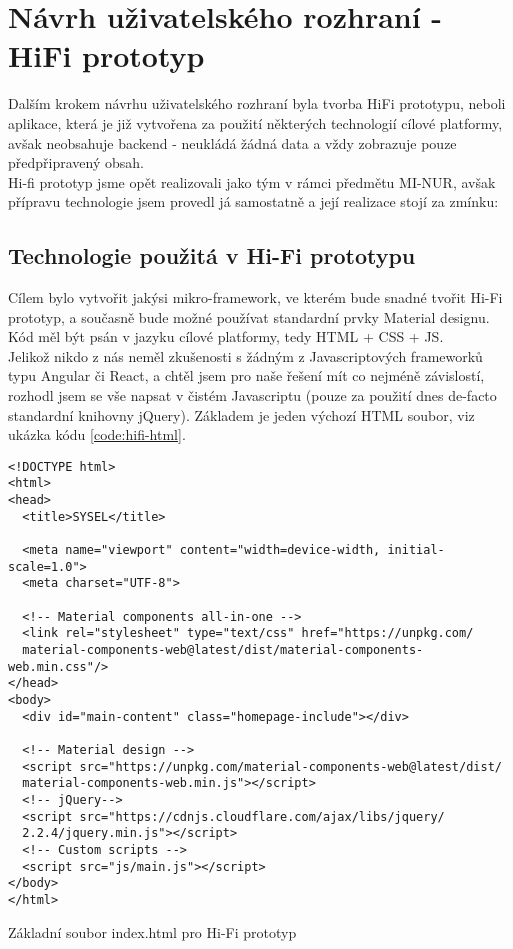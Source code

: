 \section{Návrh uživatelského rozhraní - HiFi prototyp}

Dalším krokem návrhu uživatelského rozhraní byla tvorba HiFi prototypu, neboli aplikace, která je již vytvořena za použití některých technologií cílové platformy, avšak neobsahuje backend - neukládá žádná data a vždy zobrazuje pouze předpřipravený obsah.\\
Hi-fi prototyp jsme opět realizovali jako tým v rámci předmětu MI-NUR, avšak přípravu technologie jsem provedl já samostatně a její realizace stojí za zmínku:

\subsection{Technologie použitá v Hi-Fi prototypu}

Cílem bylo vytvořit jakýsi mikro-framework, ve kterém bude snadné tvořit Hi-Fi prototyp, a současně bude možné používat standardní prvky Material designu. Kód měl být psán v jazyku cílové platformy, tedy HTML + CSS + JS.\\
Jelikož nikdo z nás neměl zkušenosti s žádným z Javascriptových frameworků typu Angular či React, a chtěl jsem pro naše řešení mít co nejméně závislostí, rozhodl jsem se vše napsat v čistém Javascriptu (pouze za použití dnes de-facto standardní knihovny jQuery). Základem je jeden výchozí HTML soubor, viz ukázka kódu \ref{code:hifi-html}.

\begin{listing}[H]
\begin{verbatim}
<!DOCTYPE html>
<html>
<head>
  <title>SYSEL</title>

  <meta name="viewport" content="width=device-width, initial-scale=1.0">
  <meta charset="UTF-8">

  <!-- Material components all-in-one -->
  <link rel="stylesheet" type="text/css" href="https://unpkg.com/
  material-components-web@latest/dist/material-components-web.min.css"/>
</head>
<body>
  <div id="main-content" class="homepage-include"></div>

  <!-- Material design -->
  <script src="https://unpkg.com/material-components-web@latest/dist/
  material-components-web.min.js"></script>
  <!-- jQuery-->
  <script src="https://cdnjs.cloudflare.com/ajax/libs/jquery/
  2.2.4/jquery.min.js"></script>
  <!-- Custom scripts -->
  <script src="js/main.js"></script>
</body>
</html>
\end{verbatim}
\caption{Základní soubor index.html pro Hi-Fi prototyp} \label{code:hifi-html}
\end{listing}


